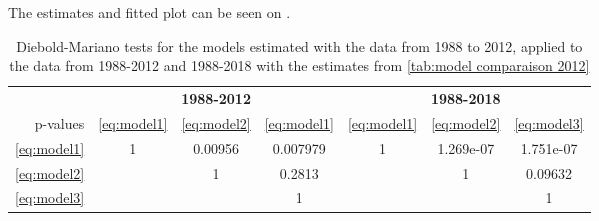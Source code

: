 \documentclass[12pt,a4paper,oneside]{book}
\begin{document}
The estimates and fitted plot can be seen on . 



\begin{table}[htp!]
    \caption{Diebold-Mariano tests for the models estimated with the data from 1988 to 2012, applied to the data from 1988-2012 and 1988-2018 with the estimates from \autoref{tab:model comparaison 2012}}
    \label{tab:Diebold Mariano 3}
     \centering \footnotesize
    \begin{tabular}{| r | c c c | c c c |}
 \multicolumn{1}{r}{} &    \multicolumn{3}{c}{\textbf{1988-2012}} &    \multicolumn{3}{c}{\textbf{1988-2018}} \\ \cline{2-7}
 \multicolumn{0}{r|}{p-values}	& \ref{eq:model1} & \ref{eq:model2} & \ref{eq:model1} & \ref{eq:model1} & \ref{eq:model2} & \ref{eq:model3} \\ \cline{1-7}
 \ref{eq:model1} & 1 & 0.00956 & 0.007979 & 1 & 1.269e-07 & 1.751e-07 \\ 
 \ref{eq:model2} &   & 1  & 0.2813 &   	  & 1 & 0.09632 \\
 \ref{eq:model3} &   &    & 1 &   &   & 1   \\ \cline{1-7}
\end{tabular}
\end{table}



\newpage
\end{document}
